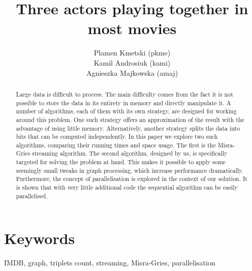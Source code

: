 \documentclass[11pt]{article} %
\title{Three actors playing together in most movies}
\author{Plamen Kmetski (pkme)\\Kamil Androsiuk (kami)\\Agnieszka Majkowska (amaj)}
\begin{document}
\maketitle

\begin{abstract}

Large data is difficult to process. The main difficulty comes from the fact it is not possible to store the data in its entirety in memory and directly manipulate it. A number of algorithms, each of them with its own strategy, are designed for working around this problem. One such strategy offers an approximation of the result with the advantage of using little memory. Alternatively, another strategy splits the data into bits that can be computed independently. In this paper we explore two such algorithms, comparing their running times and space usage. The first is the Misra-Gries streaming algorithm. The second algorithm, designed by us, is specifically targeted for solving the problem at hand. This makes it possible to apply some seemingly small tweaks in graph processing, which increase performance dramatically. Furthermore, the concept of parallelisation is explored in the context of our solution. It is shown that with very little additional code the sequential algorithm can be easily parallelised.

\end{abstract}

\section*{Keywords}
\label{Keywords}
IMDB, graph, triplets count, streaming, Misra-Gries, parallelisation









\end{document}
